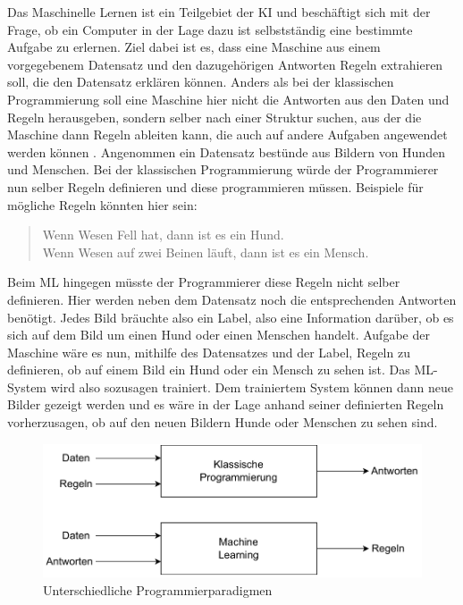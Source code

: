 Das Maschinelle Lernen ist ein Teilgebiet der \ac{KI} und beschäftigt sich mit der Frage, ob ein Computer in der Lage dazu ist selbstständig eine bestimmte Aufgabe
zu erlernen. Ziel dabei ist es, dass eine Maschine aus einem vorgegebenem Datensatz und den dazugehörigen Antworten Regeln extrahieren soll, die den Datensatz erklären
können. Anders als bei der klassischen Programmierung soll eine Maschine hier nicht die Antworten aus den Daten und Regeln herausgeben, sondern selber nach einer
Struktur suchen, aus der die Maschine dann Regeln ableiten kann, die auch auf andere Aufgaben angewendet werden können \cite[vgl. S.23f.]{DL_PY}. Angenommen ein Datensatz bestünde aus
Bildern von Hunden und Menschen. Bei der klassischen Programmierung würde der Programmierer nun selber Regeln definieren und diese programmieren müssen. Beispiele für 
mögliche Regeln könnten hier sein:
\begin{quote}
    Wenn Wesen Fell hat, dann ist es ein Hund.\\
    Wenn Wesen auf zwei Beinen läuft, dann ist es ein Mensch.
\end{quote}
Beim \ac{ML} hingegen müsste der Programmierer diese Regeln nicht selber definieren. Hier werden neben dem Datensatz noch die entsprechenden Antworten benötigt. 
Jedes Bild bräuchte also ein Label, also eine Information darüber, ob es sich auf dem Bild um einen Hund oder einen Menschen handelt. Aufgabe der Maschine wäre es nun, 
mithilfe des Datensatzes und der Label, Regeln zu definieren, ob auf einem Bild ein Hund oder ein Mensch zu sehen ist. Das \ac{ML}-System wird also sozusagen trainiert. 
Dem trainiertem System können dann neue Bilder gezeigt werden und es wäre in der Lage anhand seiner definierten Regeln vorherzusagen, ob auf den neuen Bildern Hunde oder 
Menschen zu sehen sind. 

\begin{figure}[H]
    \centering
    \includegraphics[scale=0.7]{abbildungen/Programmierparadigmen.pdf}
    \caption{Unterschiedliche Programmierparadigmen \cite[S.23]{DL_PY}}
    \label{fig:Programmierparadigma}
\end{figure}

